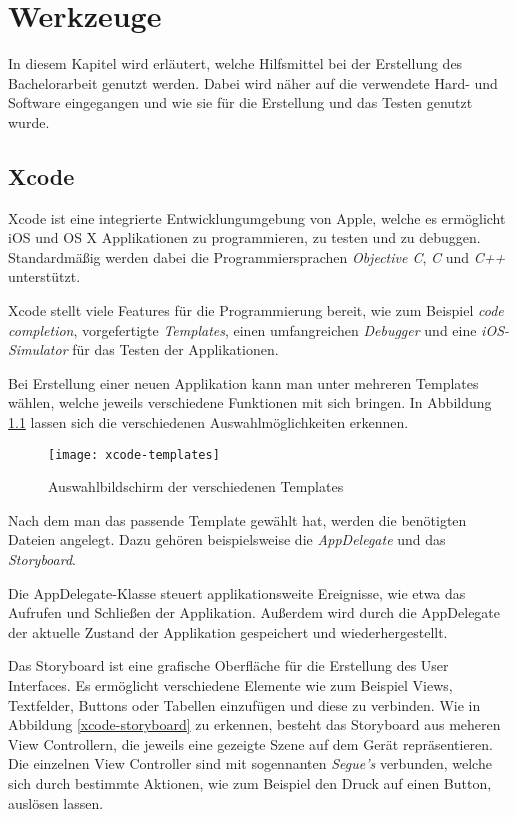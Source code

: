\chapter{Werkzeuge}
\label{chap:tools}
In diesem Kapitel wird erläutert, welche Hilfsmittel bei der Erstellung des Bachelorarbeit genutzt werden.
Dabei wird näher auf die verwendete Hard- und Software eingegangen und wie sie für die Erstellung und das Testen genutzt wurde.


\section{Xcode}
\label{sec:tools:xcode}
Xcode ist eine integrierte Entwicklungumgebung von Apple, welche es ermöglicht iOS und OS X Applikationen zu programmieren, zu testen und zu debuggen.
Standardmäßig werden dabei die Programmiersprachen \emph{Objective C}, \emph{C} und \emph{C++} unterstützt.

Xcode stellt viele Features für die Programmierung bereit, wie zum Beispiel \emph{code completion}, vorgefertigte \emph{Templates}, einen umfangreichen \emph{Debugger} und eine \emph{iOS-Simulator} für das Testen der Applikationen.

Bei Erstellung einer neuen Applikation kann man unter mehreren Templates wählen, welche jeweils verschiedene Funktionen mit sich bringen. In Abbildung \ref{xcode-templates} lassen sich die verschiedenen Auswahlmöglichkeiten erkennen.

\begin{figure}[htb!]
		\centering
	\texttt{[image: xcode-templates]}
	\caption{Auswahlbildschirm der verschiedenen Templates}
	\label{xcode-templates}
\end{figure}

Nach dem man das passende Template gewählt hat, werden die benötigten Dateien angelegt.
Dazu gehören beispielsweise die \emph{AppDelegate} und das \emph{Storyboard}.

Die AppDelegate-Klasse steuert applikationsweite Ereignisse, wie etwa das Aufrufen und Schließen der Applikation. Außerdem wird durch die AppDelegate der aktuelle Zustand der Applikation gespeichert und wiederhergestellt.

Das Storyboard ist eine grafische Oberfläche für die Erstellung des User Interfaces. Es ermöglicht verschiedene Elemente wie zum Beispiel Views, Textfelder, Buttons oder Tabellen einzufügen und diese zu verbinden. Wie in Abbildung \ref{xcode-storyboard} zu erkennen, besteht das Storyboard aus meheren View Controllern, die jeweils eine gezeigte Szene auf dem Gerät repräsentieren. Die einzelnen View Controller sind mit sogennanten \emph{Segue's} verbunden, welche sich durch bestimmte Aktionen, wie zum Beispiel den Druck auf einen Button, auslösen lassen.

